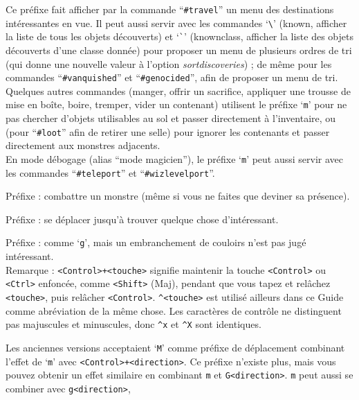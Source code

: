 \documentclass[titlepage]{article}
\begin{document}
\begin{description}[font=\mdseries\ttfamily]
Ce préfixe
fait afficher par la commande ``\texttt{\#travel}'' un menu des destinations intéressantes en vue.
Il peut aussi servir avec les commandes `\texttt{\textbackslash}' (known, afficher la
liste de tous les objets découverts) et `\texttt{\`{}}' (knownclass,
afficher la liste des objets découverts d'une classe donnée) pour proposer
un menu de plusieurs ordres de tri (qui donne une nouvelle valeur à l'option
\textit{sortdiscoveries}) ;
de même pour les commandes ``\texttt{\#vanquished}'' et ``\texttt{\#genocided}'',
afin de proposer un menu de tri.
\\
Quelques autres commandes (manger, offrir un sacrifice, appliquer une
trousse de mise en boîte, boire, tremper, vider un contenant) utilisent
le préfixe `\texttt{m}' pour ne pas chercher d'objets utilisables au
sol et passer directement à l'inventaire,
ou (pour ``\texttt{\#loot}'' afin de retirer une selle)
pour ignorer les contenants et passer directement aux monstres adjacents.
\\
En mode débogage (alias ``mode magicien''), le préfixe `\texttt{m}' peut aussi
servir avec les commandes ``\texttt{\#teleport}'' et ``\texttt{\#wizlevelport}''.
\item[F{[yuhjklbn]}]
Préfixe : combattre un monstre (même si vous ne faites que deviner sa présence).
\item[g{[yuhjklbn]}]
Préfixe : se déplacer jusqu'à trouver quelque chose d'intéressant.
\item[G{[yuhjklbn]} \textrm{\textmd{ou}} <Control>+{[yuhjklbn]}]
Préfixe : comme `\texttt{g}', mais un embranchement de couloirs n'est pas jugé
intéressant.
\\
Remarque : \texttt{<Control>+<touche>} signifie maintenir la touche \texttt{<Control>} ou
\texttt{<Ctrl>} enfoncée, comme \texttt{<Shift>} (Maj), pendant que vous tapez et relâchez
\texttt{<touche>}, puis relâcher \texttt{<Control>}.  \texttt{\textasciicircum <touche>} est utilisé
ailleurs dans ce Guide comme abréviation de la même chose.  Les caractères de
contrôle ne distinguent pas majuscules et minuscules, donc \texttt{\textasciicircum x} et \texttt{\textasciicircum X} sont identiques.
\item[M{[yuhjklbn]}]
Les anciennes versions acceptaient `\texttt{M}' comme préfixe de déplacement
combinant l'effet de `\texttt{m}' avec \texttt{<Control>+<direction>}.
Ce préfixe n'existe plus, mais vous pouvez obtenir un effet similaire
en combinant \texttt{m} et \texttt{G<direction>}.
\texttt{m} peut aussi se combiner avec \texttt{g<direction>},

\end{description}
\end{document}
